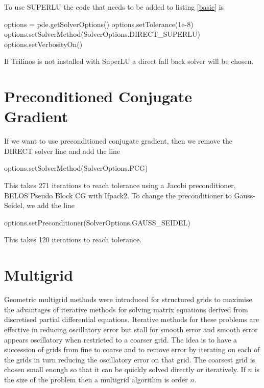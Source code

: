 To use SUPERLU the code that needs to be added to listing \ref{basic} is 
\begin{python}[caption=SuperLU, label=superLU ]
options = pde.getSolverOptions()
options.setTolerance(1e-8)
options.setSolverMethod(SolverOptions.DIRECT_SUPERLU)
options.setVerbosityOn()
\end{python}
If Trilinos is not installed with SuperLU a direct fall back solver will be chosen.

\section{Preconditioned Conjugate Gradient}
If we want to use preconditioned conjugate gradient, then we remove the DIRECT solver line and add the line
\begin{python}[caption=Preconditioned conjugate gradient defaults, label=PCG]
options.setSolverMethod(SolverOptions.PCG)        
\end{python}
This takes 271 iterations to reach tolerance using a Jacobi preconditioner, BELOS Pseudo Block CG with Ifpack2.  To change the preconditioner to Gauss-Seidel, we add the line
\begin{python}
options.setPreconditioner(SolverOptions.GAUSS_SEIDEL)
\end{python}
This takes 120 iterations to reach tolerance.



\section{Multigrid}
Geometric multigrid methods were introduced for structured grids to maximise the advantages of iterative methods for solving matrix equations derived from discretised partial differential equations.  Iterative methods for these problems are effective in reducing oscillatory error but stall for smooth error and smooth error appears oscillatory when restricted to a coarser grid.  The idea is to have a succession of grids from fine to coarse and to remove error by iterating on each of the grids in turn reducing the oscillatory error on that grid.  The coarsest grid is chosen small enough so that it can be quickly solved directly or iteratively. If $n$ is the size of the problem then a multigrid algorithm is order $n$.

